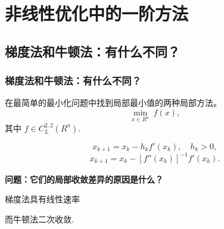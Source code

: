\documentclass[handout,10pt]{beamer} %
\begin{document}








\section{非线性优化中的一阶方法}
\label{sec_1_3}

\subsection{梯度法和牛顿法：有什么不同？} \label{sec_1_3_1}



\begin{frame}[fragile]
\frametitle{梯度法和牛顿法：有什么不同？}

在最简单的最小化问题中找到局部最小值的两种局部方法。
$$
    \min_{x\in R^n}^{} \ f(x),
$$
其中 $f\in C_{L}^{2,2}(R^n)$.

$$
    x_{k+1} = x_{k} - h_k f'(x_k), \quad h_k >0,
$$
$$
  x_{k+1} = x_{k} - [f''(x_k)]_{}^{-1} f'(x_k).
$$

\textbf{问题：它们的局部收敛差异的原因是什么？}

  梯度法具有线性速率

  而牛顿法二次收敛.



\end{frame}
\end{document}
